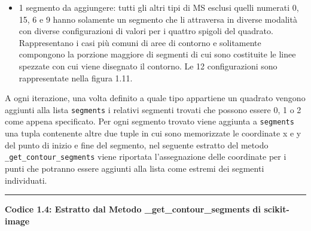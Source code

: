 \documentclass[12pt,a4paper]{report}
\begin{document}
\begin{itemize}
\item 1 segmento da aggiungere: tutti gli altri tipi di MS esclusi quelli numerati 0, 15, 6 e 9 hanno solamente un segmento che li attraversa in diverse modalità con diverse configurazioni di valori per i quattro spigoli del quadrato.  Rappresentano i casi più comuni di aree di contorno e solitamente compongono la porzione maggiore di segmenti di cui sono costituite le linee spezzate con cui viene disegnato il contorno. Le 12 configurazioni sono rappresentate nella figura 1.11.
\begin{figure}[H]
\centering
\begin{floatrow}[1]
\end{floatrow}
\end{figure}

\end{itemize}
A ogni iterazione, una volta definito a quale tipo appartiene un quadrato vengono aggiunti alla lista \verb|segments| i relativi segmenti trovati che possono essere 0, 1 o 2 come appena specificato.  Per ogni segmento trovato viene aggiunta a  \verb|segments| una tupla contenente altre due tuple in cui sono memorizzate le coordinate x e y del punto di inizio e fine del segmento, nel seguente estratto del metodo  \verb|_get_contour_segments| viene riportata l'assegnazione delle coordinate per i punti che potranno essere aggiunti alla lista come estremi dei segmenti individuati.\newpage
\noindent\rule[0.5ex]{\linewidth}{2pt}
\small{\textbf{Codice 1.4: Estratto dal Metodo \_get\_contour\_segments di scikit-image}} \\
\end{document}
